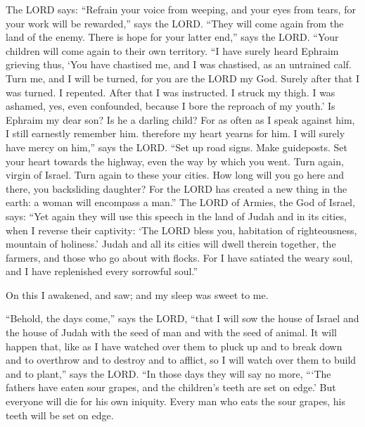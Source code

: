  The LORD says: ``Refrain your voice from weeping, and
your eyes from tears, for your work will be rewarded,'' says the LORD.
``They will come again from the land of the enemy.  There
is hope for your latter end,'' says the LORD. ``Your children will come
again to their own territory.  ``I have surely heard
Ephraim grieving thus, `You have chastised me, and I was chastised, as
an untrained calf. Turn me, and I will be turned, for you are the LORD
my God.  Surely after that I was turned. I repented.
After that I was instructed. I struck my thigh. I was ashamed, yes, even
confounded, because I bore the reproach of my youth.'  Is
Ephraim my dear son? Is he a darling child? For as often as I speak
against him, I still earnestly remember him. therefore my heart yearns
for him. I will surely have mercy on him,'' says the LORD.
 ``Set up road signs. Make guideposts. Set your heart
towards the highway, even the way by which you went. Turn again, virgin
of Israel. Turn again to these your cities.  How long
will you go here and there, you backsliding daughter? For the LORD has
created a new thing in the earth: a woman will encompass a man.''
 The LORD of Armies, the God of Israel, says: ``Yet again
they will use this speech in the land of Judah and in its cities, when I
reverse their captivity: `The LORD bless you, habitation of
righteousness, mountain of holiness.'  Judah and all its
cities will dwell therein together, the farmers, and those who go about
with flocks.  For I have satiated the weary soul, and I
have replenished every sorrowful soul.''

 On this I awakened, and saw; and my sleep was sweet to
me.

 ``Behold, the days come,'' says the LORD, ``that I will
sow the house of Israel and the house of Judah with the seed of man and
with the seed of animal.  It will happen that, like as I
have watched over them to pluck up and to break down and to overthrow
and to destroy and to afflict, so I will watch over them to build and to
plant,'' says the LORD.  ``In those days they will say no
more, ```The fathers have eaten sour grapes, and the children's teeth
are set on edge.'  But everyone will die for his own
iniquity. Every man who eats the sour grapes, his teeth will be set on
edge.

